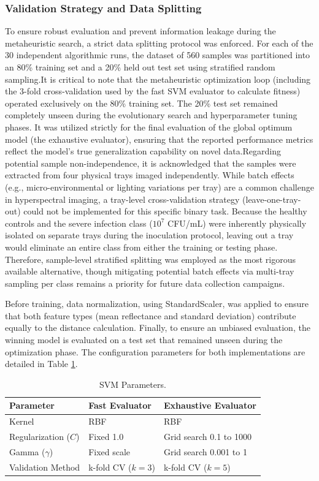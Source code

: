 \documentclass[runningheads]{llncs}
\begin{document}
\subsubsection{Validation Strategy and Data Splitting}
To ensure robust evaluation and prevent information leakage during the metaheuristic search, a strict data splitting protocol was enforced. For each of the 30 independent algorithmic runs, the dataset of 560 samples was partitioned into an 80\% training set and a 20\% held out test set using stratified random sampling.It is critical to note that the metaheuristic optimization loop (including the 3-fold cross-validation used by the fast SVM evaluator to calculate fitness) operated exclusively on the 80\% training set. The 20\% test set remained completely unseen during the evolutionary search and hyperparameter tuning phases. It was utilized strictly for the final evaluation of the global optimum model (the exhaustive evaluator), ensuring that the reported performance metrics reflect the model's true generalization capability on novel data.Regarding potential sample non-independence, it is acknowledged that the samples were extracted from four physical trays imaged independently. While batch effects (e.g., micro-environmental or lighting variations per tray) are a common challenge in hyperspectral imaging, a tray-level cross-validation strategy (leave-one-tray-out) could not be implemented for this specific binary task. Because the healthy controls and the severe infection class ($10^7$ CFU/mL) were inherently physically isolated on separate trays during the inoculation protocol, leaving out a tray would eliminate an entire class from either the training or testing phase. Therefore, sample-level stratified splitting was employed as the most rigorous available alternative, though mitigating potential batch effects via multi-tray sampling per class remains a priority for future data collection campaigns.

Before training, data normalization, using StandardScaler, was applied to ensure that both feature types (mean reflectance and standard deviation) contribute equally to the distance calculation. 
Finally, to ensure an unbiased evaluation, the winning model is evaluated on a test set that remained unseen during the optimization phase. 
The configuration parameters for both implementations are detailed in Table \ref{tab3}.

\begin{table}
    \centering
    \caption{SVM Parameters.\label{tab3}}
    \begin{tabular}{l|l|l}
        \hline
        Parameter & Fast Evaluator & Exhaustive Evaluator \\
        \hline
        Kernel & RBF & RBF \\
        Regularization ($C$) & Fixed 1.0 & Grid search 0.1 to 1000 \\
        Gamma ($\gamma$) & Fixed scale & Grid search 0.001 to 1 \\
        Validation Method & k-fold CV ($k=3$) & k-fold CV ($k=5$) \\
        \hline
    \end{tabular}
\end{table}
\end{document}
